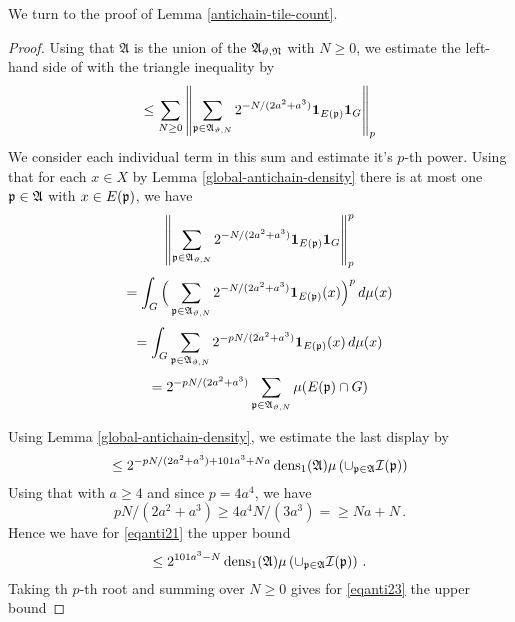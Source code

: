 {We turn to the proof of Lemma \ref{antichain-tile-count}.




\begin{proof}


Using that $\mathfrak{A}$ is the union of the
$\mathfrak{A_{{\vartheta},N}}$ with $N\ge 0$,
we estimate the left-hand side of
with the triangle inequality by
\begin{equation}\label{eqanti23}
\le \sum_{N\ge 0} \left\|\sum_{{\mathfrak p}\in \mathfrak{A}_{{\vartheta},N}} 2^{-N/(2a^2+a^3)}\mathbf{1}_{E({\mathfrak p})} \mathbf{1}_G\right\|_{p}
\end{equation}
We consider each individual term in this sum and estimate it's $p$-th power.
   Using that for each $x\in X$  by Lemma \ref{global-antichain-density} there is at most one ${\mathfrak p}\in \mathfrak{A}$ with $x\in E({\mathfrak p})$,
 we have
 \begin{equation}
     \left\|\sum_{{\mathfrak p}\in \mathfrak{A}_{{\vartheta},N}} 2^{-N/(2a^2+a^3)}\mathbf{1}_{E({\mathfrak p})} \mathbf{1}_G\right\|_{p}^p
 \end{equation}
\begin{equation}
    =\int_G\Big(\sum_{{\mathfrak p}\in \mathfrak{A}_{{\vartheta},N}}2^{-N/(2a^2+a^3)}\mathbf{1}_{E({\mathfrak p})}(x)\Big)^p\, d\mu(x)
\end{equation}
\begin{equation}
  =   \int _G\sum_{{\mathfrak p}\in\mathfrak{A}_{{\vartheta},N}}2^{-pN/(2a^2+a^3)}\mathbf{1}_{E({\mathfrak p})}(x)\, d\mu(x)
\end{equation}
\begin{equation}
  =   2^{-pN/(2a^2+a^3)} \sum_{{\mathfrak p}\in\mathfrak{A}_{{\vartheta},N}}\mu(E({\mathfrak p})\cap G)
\end{equation}

Using Lemma \ref{global-antichain-density}, we estimate the last display by
\begin{equation}\label{eqanti21}
    \le  2^{-pN/(2a^2+a^3)+101a^3+Na}\operatorname{\operatorname{dens}}_1(\mathfrak{A})\mu\left(\cup_{{\mathfrak p}\in\mathfrak{A}}{\mathcal{I}}({\mathfrak p})\right)
\end{equation}
Using that with $a\ge 4$ and since $p = 4a^4$, we have
\begin{equation}
    pN/(2a^2+a^3)\ge
    4a^4N/(3a^3)= \ge Na+N\, .
\end{equation}
Hence we have for \eqref{eqanti21} the upper bound
\begin{equation}\label{eqanti22}
\le  2^{101a^3-N}\operatorname{\operatorname{dens}}_1(\mathfrak{A})\mu\left(\cup_{{\mathfrak p}\in\mathfrak{A}}{\mathcal{I}}({\mathfrak p})\right)\, .
\end{equation}
Taking th $p$-th root and summing over $N\ge 0$ gives for \eqref{eqanti23} the upper bound


\end{proof}}
